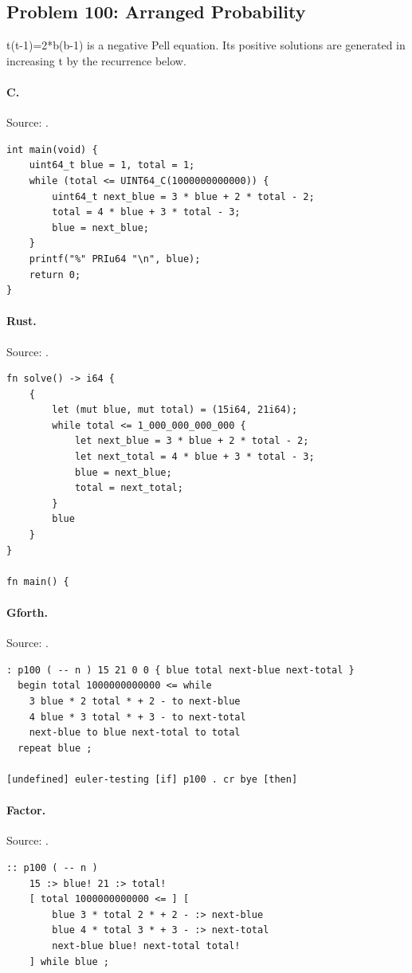 \subsection{Problem 100: Arranged Probability}
\label{walkthrough:p100}
t(t-1)=2*b(b-1) is a negative Pell equation. Its positive solutions are generated in increasing t by the recurrence below.

\paragraph{C.} Source: .
\begin{lstlisting}
int main(void) {
    uint64_t blue = 1, total = 1;
    while (total <= UINT64_C(1000000000000)) {
        uint64_t next_blue = 3 * blue + 2 * total - 2;
        total = 4 * blue + 3 * total - 3;
        blue = next_blue;
    }
    printf("%" PRIu64 "\n", blue);
    return 0;
}
\end{lstlisting}

\paragraph{Rust.} Source: .
\begin{lstlisting}
fn solve() -> i64 {
    {
        let (mut blue, mut total) = (15i64, 21i64);
        while total <= 1_000_000_000_000 {
            let next_blue = 3 * blue + 2 * total - 2;
            let next_total = 4 * blue + 3 * total - 3;
            blue = next_blue;
            total = next_total;
        }
        blue
    }
}

fn main() {
\end{lstlisting}

\paragraph{Gforth.} Source: .
\begin{lstlisting}
: p100 ( -- n ) 15 21 0 0 { blue total next-blue next-total }
  begin total 1000000000000 <= while
    3 blue * 2 total * + 2 - to next-blue
    4 blue * 3 total * + 3 - to next-total
    next-blue to blue next-total to total
  repeat blue ;

[undefined] euler-testing [if] p100 . cr bye [then]
\end{lstlisting}

\paragraph{Factor.} Source: .
\begin{lstlisting}
:: p100 ( -- n )
    15 :> blue! 21 :> total!
    [ total 1000000000000 <= ] [
        blue 3 * total 2 * + 2 - :> next-blue
        blue 4 * total 3 * + 3 - :> next-total
        next-blue blue! next-total total!
    ] while blue ;
\end{lstlisting}

